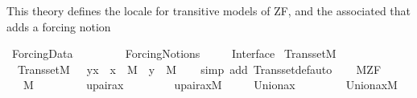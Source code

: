 %
\begin{isabellebody}%
%
%
\isadelimdocument
%
\endisadelimdocument
%
\isatagdocument
%
\isamarkuptrue%
%
\endisatagdocument
{\isafolddocument}%
%
\isadelimdocument
%
\endisadelimdocument
%
\begin{isamarkuptext}%
This theory defines the locale  for
transitive models of ZF, and the associated 
 that adds a forcing notion%
\end{isamarkuptext}\isamarkuptrue%
%
\isadelimtheory
%
\endisadelimtheory
%
\isatagtheory
{}\isamarkupfalse%
\ Forcing{\isacharunderscore}{\kern0pt}Data\isanewline
\ \ \ \ \isanewline
\ \ \ \ Forcing{\isacharunderscore}{\kern0pt}Notions\ \isanewline
\ \ \ \ Interface\isanewline
\isanewline
{}%
\endisatagtheory
{\isafoldtheory}%
%
\isadelimtheory
%
\endisadelimtheory
\isanewline
\isanewline
{}\isamarkupfalse%
\ Transset{\isacharunderscore}{\kern0pt}M\ {\isacharcolon}{\kern0pt}\isanewline
\ \ {\isachardoublequoteopen}Transset{\isacharparenleft}{\kern0pt}M{\isacharparenright}{\kern0pt}\ {\isasymLongrightarrow}\ \ y{\isasymin}x\ {\isasymLongrightarrow}\ x\ {\isasymin}\ M\ {\isasymLongrightarrow}\ y\ {\isasymin}\ M{\isachardoublequoteclose}\isanewline
%
\isadelimproof
\ \ %
\endisadelimproof
%
\isatagproof
{}\isamarkupfalse%
\ {\isacharparenleft}{\kern0pt}simp\ add{\isacharcolon}{\kern0pt}\ Transset{\isacharunderscore}{\kern0pt}def{\isacharcomma}{\kern0pt}auto{\isacharparenright}{\kern0pt}%
\endisatagproof
{\isafoldproof}%
%
\isadelimproof
\ \ \isanewline
%
\endisadelimproof
\isanewline
\isanewline
{}\isamarkupfalse%
\ M{\isacharunderscore}{\kern0pt}ZF\ {\isacharequal}{\kern0pt}\ \isanewline
\ \ \ M\ \isanewline
\ \ \ \isanewline
\ \ \ \ upair{\isacharunderscore}{\kern0pt}ax{\isacharcolon}{\kern0pt}\ \ \ \ \ \ \ \ \ {\isachardoublequoteopen}upair{\isacharunderscore}{\kern0pt}ax{\isacharparenleft}{\kern0pt}{\isacharhash}{\kern0pt}{\isacharhash}{\kern0pt}M{\isacharparenright}{\kern0pt}{\isachardoublequoteclose}\isanewline
\ \ \ \ \ Union{\isacharunderscore}{\kern0pt}ax{\isacharcolon}{\kern0pt}\ \ \ \ \ \ \ \ \ {\isachardoublequoteopen}Union{\isacharunderscore}{\kern0pt}ax{\isacharparenleft}{\kern0pt}{\isacharhash}{\kern0pt}{\isacharhash}{\kern0pt}M{\isacharparenright}{\kern0pt}{\isachardoublequoteclose}\isanewline

\end{isabellebody}
